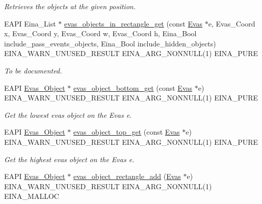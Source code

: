 \begin{DoxyCompactItemize}
\begin{DoxyCompactList}\small\item\em Retrieves the objects at the given position. \item\end{DoxyCompactList}\item 
EAPI Eina\_\-List $\ast$ \hyperlink{group__Evas__Object__Group__Find_gae5d4af2f915c2efe4e5cfc22644b8c53}{evas\_\-objects\_\-in\_\-rectangle\_\-get} (const \hyperlink{group__Evas__Canvas_ga5ff87cc4ce6bc43e3b640a6d37f73043}{Evas} $\ast$e, Evas\_\-Coord x, Evas\_\-Coord y, Evas\_\-Coord w, Evas\_\-Coord h, Eina\_\-Bool include\_\-pass\_\-events\_\-objects, Eina\_\-Bool include\_\-hidden\_\-objects) EINA\_\-WARN\_\-UNUSED\_\-RESULT EINA\_\-ARG\_\-NONNULL(1) EINA\_\-PURE
\begin{DoxyCompactList}\small\item\em To be documented. \item\end{DoxyCompactList}\item 
EAPI \hyperlink{group__Evas__Object__Group_ga9e19e6dd1f517a0ba437c0114d3e7c97}{Evas\_\-Object} $\ast$ \hyperlink{group__Evas__Object__Group__Find_ga3e06dcd04da8cd9d64e106f7ede8db9e}{evas\_\-object\_\-bottom\_\-get} (const \hyperlink{group__Evas__Canvas_ga5ff87cc4ce6bc43e3b640a6d37f73043}{Evas} $\ast$e) EINA\_\-WARN\_\-UNUSED\_\-RESULT EINA\_\-ARG\_\-NONNULL(1) EINA\_\-PURE
\begin{DoxyCompactList}\small\item\em Get the lowest evas object on the Evas {\ttfamily e}. \item\end{DoxyCompactList}\item 
EAPI \hyperlink{group__Evas__Object__Group_ga9e19e6dd1f517a0ba437c0114d3e7c97}{Evas\_\-Object} $\ast$ \hyperlink{group__Evas__Object__Group__Find_ga2acf1e026d576ba355ca1b1ea24e0736}{evas\_\-object\_\-top\_\-get} (const \hyperlink{group__Evas__Canvas_ga5ff87cc4ce6bc43e3b640a6d37f73043}{Evas} $\ast$e) EINA\_\-WARN\_\-UNUSED\_\-RESULT EINA\_\-ARG\_\-NONNULL(1) EINA\_\-PURE
\begin{DoxyCompactList}\small\item\em Get the highest evas object on the Evas {\ttfamily e}. \item\end{DoxyCompactList}\item 
EAPI \hyperlink{group__Evas__Object__Group_ga9e19e6dd1f517a0ba437c0114d3e7c97}{Evas\_\-Object} $\ast$ \hyperlink{group__Evas__Object__Rectangle_gaa08a28171d59c43d106e1ea4f986fefa}{evas\_\-object\_\-rectangle\_\-add} (\hyperlink{group__Evas__Canvas_ga5ff87cc4ce6bc43e3b640a6d37f73043}{Evas} $\ast$e) EINA\_\-WARN\_\-UNUSED\_\-RESULT EINA\_\-ARG\_\-NONNULL(1) EINA\_\-MALLOC

\end{DoxyCompactItemize}

